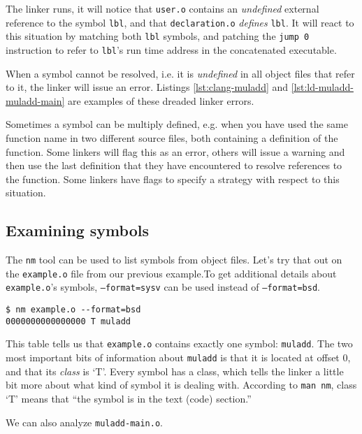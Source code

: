 \documentclass[12pt,a4paper]{article}
\newcommand{\listobjsymbols}{\texttt{nm}}
\newcommand{\manpageref}[1]{\texttt{man #1}}
\newcommand{\labelname}[1]{\texttt{#1}}
\newcommand{\filename}[1]{\texttt{#1}}
\begin{document}
The linker runs, it will notice that \filename{user.o} contains an \emph{undefined} external reference to the symbol \labelname{lbl}, and that \filename{declaration.o} \emph{defines} \labelname{lbl}. It will react to this situation by matching both \labelname{lbl} symbols, and patching the \texttt{jump 0} instruction to refer to \labelname{lbl}'s run time address in the concatenated executable.

When a symbol cannot be resolved, i.e. it is \emph{undefined} in all object files that refer to it, the linker will issue an error. Listings \ref{lst:clang-muladd} and \ref{lst:ld-muladd-muladd-main} are examples of these dreaded linker errors. 

Sometimes a symbol can be multiply defined, e.g. when you have used the same function name in two different source files, both containing a definition of the function. Some linkers will flag this as an error, others will issue a warning and then use the last definition that they have encountered to resolve references to the function. Some linkers have flags to specify a strategy with respect to this situation.

\subsection{Examining symbols}
\label{sec:examining-symbols}

The \listobjsymbols{} tool can be used to list symbols from object files. Let's try that out on the \filename{example.o} file from our previous example.To get additional details about \texttt{example.o}'s symbols, \texttt{--format=sysv} can be used instead of \texttt{--format=bsd}.\\

\begin{lstlisting}[caption=listing all symbols in \filename{example.o}]
$ nm example.o --format=bsd
0000000000000000 T muladd
\end{lstlisting}

This table tells us that \filename{example.o} contains exactly one symbol: \labelname{muladd}. The two most important bits of information about \labelname{muladd} is that it is located at offset 0, and that its \emph{class} is `T'. Every symbol has a class, which tells the linker a little bit more about what kind of symbol it is dealing with. According to \manpageref{\listobjsymbols{}}, class `T' means that ``the symbol is in the text (code) section.'' 

We can also analyze \texttt{muladd-main.o}.\\
\end{document}
